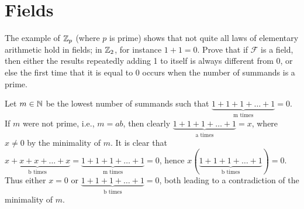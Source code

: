 \section{Fields}

\setcounter{problem}{3}
\begin{problem}
  The example of $\mathbb{Z}_p$ (where $p$ is prime) shows that not quite all laws of elementary arithmetic hold in fields;
  in $\mathbb{Z}_2$, for instance $1 + 1 = 0$.
  Prove that if $\mathcal{F}$ is a field, then either the results repeatedly adding 1 to itself is always different from 0, or else the first time that it is equal to 0 occurs when the number of summands is a prime.
\end{problem}

\begin{solution}
  Let $m \in \mathbb{N}$ be the lowest number of summands such that $\underbrace{1 + 1 + 1 + \ldots + 1}_{\text{m times}} = 0$.
  If $m$ were not prime, i.e., $m = ab$, then clearly $\underbrace{1 + 1 + 1 + \ldots + 1}_{\text{a times}} = x$, where $x \neq 0$ by the minimality of $m$.
  It is clear that $\underbrace{x + x + x + \ldots + x}_{\text{b times}} = \underbrace{1 + 1 + 1 + \ldots + 1}_{\text{m times}} = 0$, hence $x(\underbrace{1 + 1 + 1 + \ldots + 1}_{\text{b times}}) = 0$.
  Thus either $x = 0$ or $\underbrace{1 + 1 + 1 + \ldots + 1}_{\text{b times}} = 0$, both leading to a contradiction of the minimality of $m$.
\end{solution}
